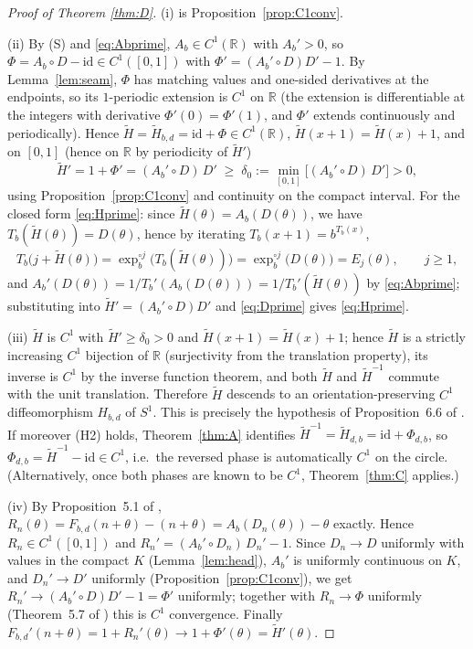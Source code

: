 \documentclass[11pt]{article}
\theoremstyle{definition}
\theoremstyle{remark}
\newcommand{\R}{\mathbb{R}}
\newcommand{\Sone}{S^{1}}
\newcommand{\Ab}{A_{b}}
\newcommand{\Tb}{T_{b}}
\newcommand{\expb}{\exp_{b}}
\newcommand{\Ht}{\widetilde H}
\begin{document}
\begin{proof}[Proof of Theorem \textup{\ref{thm:D}}]
\textup{(i)} is Proposition~\ref{prop:C1conv}.

\textup{(ii)} By (S) and \eqref{eq:Abprime}, $\Ab\in C^{1}(\R)$ with
$\Ab'>0$, so $\Phi=\Ab\circ D-\mathrm{id}\in C^{1}([0,1])$ with
$\Phi'=(\Ab'\circ D)D'-1$. By Lemma~\ref{lem:seam}, $\Phi$ has matching
values and one-sided derivatives at the endpoints, so its $1$-periodic
extension is $C^{1}$ on $\R$ (the extension is differentiable at the
integers with derivative $\Phi'(0)=\Phi'(1)$, and $\Phi'$ extends
continuously and periodically). Hence $\Ht=\Ht_{b,d}=\mathrm{id}+\Phi\in
C^{1}(\R)$, $\Ht(x+1)=\Ht(x)+1$, and on $[0,1]$ (hence on $\R$ by
periodicity of $\Ht'$)
\[
\Ht'=1+\Phi'=(\Ab'\circ D)\,D'
\;\ge\;\delta_0:=\min_{[0,1]}\big[(\Ab'\circ D)\,D'\big]>0 ,
\]
using Proposition~\ref{prop:C1conv} and continuity on the compact
interval. For the closed form \eqref{eq:Hprime}: since
$\Ht(\theta)=\Ab(D(\theta))$, we have $\Tb(\Ht(\theta))=D(\theta)$, hence
by iterating $\Tb(x+1)=b^{\Tb(x)}$,
\[
\Tb\big(j+\Ht(\theta)\big)=\expb^{\circ j}\big(\Tb(\Ht(\theta))\big)
=\expb^{\circ j}\big(D(\theta)\big)=E_j(\theta),
\qquad j\ge1,
\]
and $\Ab'(D(\theta))=1/\Tb'(\Ab(D(\theta)))=1/\Tb'(\Ht(\theta))$ by
\eqref{eq:Abprime}; substituting into
$\Ht'=(\Ab'\circ D)D'$ and \eqref{eq:Dprime} gives \eqref{eq:Hprime}.

\textup{(iii)} $\Ht$ is $C^{1}$ with $\Ht'\ge\delta_0>0$ and
$\Ht(x+1)=\Ht(x)+1$; hence $\Ht$ is a strictly increasing $C^{1}$
bijection of $\R$ (surjectivity from the translation property), its
inverse is $C^{1}$ by the inverse function theorem, and both $\Ht$ and
$\Ht^{-1}$ commute with the unit translation. Therefore $\Ht$ descends to
an orientation-preserving $C^{1}$ diffeomorphism $H_{b,d}$ of $\Sone$.
This is precisely the hypothesis of Proposition~6.6 of \cite{J}. If
moreover (H2) holds, Theorem~\ref{thm:A} identifies
$\Ht^{-1}=\Ht_{d,b}=\mathrm{id}+\Phi_{d,b}$, so
$\Phi_{d,b}=\Ht^{-1}-\mathrm{id}\in C^{1}$, i.e.\ the reversed phase is
automatically $C^{1}$ on the circle. (Alternatively, once both phases
are known to be $C^{1}$, Theorem~\ref{thm:C} applies.)

\textup{(iv)} By Proposition~5.1 of \cite{J},
$R_n(\theta)=F_{b,d}(n+\theta)-(n+\theta)=\Ab(D_n(\theta))-\theta$
exactly. Hence $R_n\in C^{1}([0,1])$ and
$R_n'=(\Ab'\circ D_n)\,D_n'-1$. Since $D_n\to D$ uniformly with values in
the compact $K$ (Lemma~\ref{lem:head}), $\Ab'$ is uniformly continuous on
$K$, and $D_n'\to D'$ uniformly (Proposition~\ref{prop:C1conv}), we get
$R_n'\to(\Ab'\circ D)D'-1=\Phi'$ uniformly; together with $R_n\to\Phi$
uniformly (Theorem~5.7 of \cite{J}) this is $C^{1}$ convergence. Finally
$F_{b,d}'(n+\theta)=1+R_n'(\theta)\to 1+\Phi'(\theta)=\Ht'(\theta)$.
\end{proof}
\end{document}
